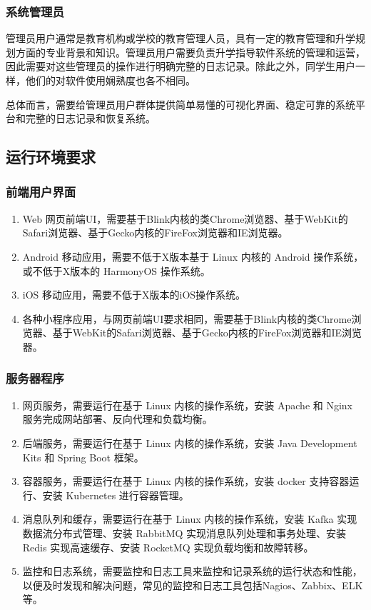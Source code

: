 \documentclass[UTF8]{ctexart}
\newcommand{\m}[1]{\textcolor{modify}{#1}}
\begin{document}
    \subsubsection{系统管理员}
    \par
    \m{管理员用户通常是教育机构或学校的教育管理人员，具有一定的教育管理和升学规划方面的专业背景和知识}。管理员用户需要负责升学指导软件系统的管理和运营，因此需要对这些管理员的操作进行明确完整的日志记录。除此之外，同学生用户一样，\m{他们的对软件使用娴熟度也各不相同}。

    \par
    总体而言，需要给管理员用户群体提供简单易懂的可视化界面、稳定可靠的系统平台和完整的日志记录和恢复系统。
    
    \subsection{运行环境要求}
    \subsubsection{前端用户界面}
    \begin{enumerate}
        \item Web 网页前端UI，需要基于Blink内核的类Chrome浏览器、基于WebKit的Safari浏览器、基于Gecko内核的FireFox浏览器和IE浏览器。
        \item Android 移动应用，需要不低于X版本基于 Linux 内核的 Android 操作系统，或不低于X版本的 HarmonyOS 操作系统。
        \item iOS 移动应用，需要不低于X版本的iOS操作系统。
        \item 各种小程序应用，与网页前端UI要求相同，需要基于Blink内核的类Chrome浏览器、基于WebKit的Safari浏览器、基于Gecko内核的FireFox浏览器和IE浏览器。
    \end{enumerate}
    \subsubsection{服务器程序}
    \begin{enumerate}
        \item 网页服务，需要运行在基于 Linux 内核的操作系统，安装 Apache 和 Nginx 服务完成网站部署、反向代理和负载均衡。
        \item 后端服务，需要运行在基于 Linux 内核的操作系统，安装 Java Development Kits 和 Spring Boot 框架。
        \item 容器服务，需要运行在基于 Linux 内核的操作系统，安装 docker 支持容器运行、安装 Kubernetes 进行容器管理。
        \item 消息队列和缓存，需要运行在基于 Linux 内核的操作系统，安装 Kafka 实现数据流分布式管理、安装 RabbitMQ 实现消息队列处理和事务处理、安装 Redis 实现高速缓存、安装 RocketMQ 实现负载均衡和故障转移。
        \item 监控和日志系统，需要监控和日志工具来监控和记录系统的运行状态和性能，以便及时发现和解决问题，\m{常见的监控和日志工具包括Nagios、Zabbix、ELK等}。
    \end{enumerate}
\end{document}
